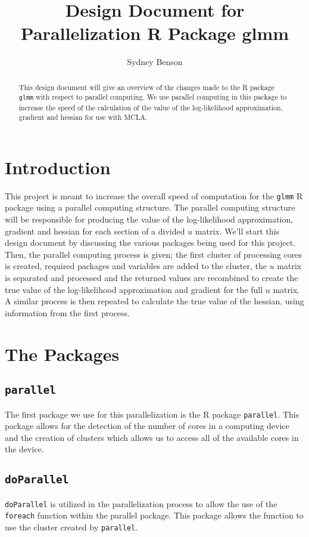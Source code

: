 \documentclass{article}
\title{Design Document for Parallelization R Package glmm}
\author{Sydney Benson}
\begin{document}
\maketitle{}

\begin{abstract}
This design document will give an overview of the changes made to the R package \texttt{glmm} with respect to parallel computing. We use parallel computing in this package to increase the speed of the calculation of the value of the log-likelihood approximation, gradient and hessian for use with MCLA. 
\end{abstract}

\section{Introduction}
This project is meant to increase the overall speed of computation for the \texttt{glmm} R package using a parallel computing structure. The parallel computing structure will be responsible for producing the value of the log-likelihood approximation, gradient and hessian for each section of a divided $u$ matrix. We'll start this design document by discussing the various packages being used for this project. Then, the parallel computing process is given; the first cluster of processing cores is created, required packages and variables are added to the cluster, the $u$ matrix is separated and processed and the returned values are recombined to create the true value of the log-likelihood approximation and gradient for the full $u$ matrix. A similar process is then repeated to calculate the true value of the hessian, using information from the first process.

\section{The Packages}
\subsection{\texttt{parallel}}
The first package we use for this parallelization is the R package \texttt{parallel}. This package allows for the detection of the number of cores in a computing device and the creation of clusters which allows us to access all of the available cores in the device.

\subsection{\texttt{doParallel}}
\texttt{doParallel} is utilized in the parallelization process to allow the use of the \texttt{foreach} function within the parallel package. This package allows the function to use the cluster created by \texttt{parallel}. 
\end{document}
